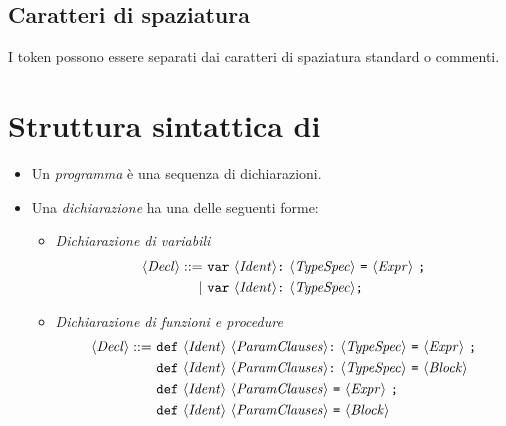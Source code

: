 \subsection*{Caratteri di spaziatura}
I token possono essere separati dai caratteri di spaziatura standard o commenti.

\section{Struttura sintattica di \SBF}
\begin{itemize}
\item Un \emph{programma} è una sequenza di dichiarazioni.

\item Una \emph{dichiarazione} ha una delle seguenti forme:
\begin{itemize}
	\item \emph{Dichiarazione di variabili}
	\begin{align*}
	\token{Decl} ::=\ &\texttt{var}\ \token{Ident} \texttt{:}\ \token{TypeSpec}\ \texttt{=}\ \token{Expr}\ \texttt{;}\\
	|\ &\texttt{var}\ \token{Ident} \texttt{:}\ \token{TypeSpec} \texttt{;}
	\end{align*}
	
	\item \emph{Dichiarazione di funzioni e procedure}
	\begin{align*}
	\token{Decl} ::=\ & \texttt{def}\ \token{Ident}\ \token{ParamClauses} \texttt{:}\ \token{TypeSpec}\ \texttt{=}\ \token{Expr}\ \texttt{;}\\
	& \texttt{def}\ \token{Ident}\ \token{ParamClauses} \texttt{:}\ \token{TypeSpec}\ \texttt{=}\ \token{Block}\\
	& \texttt{def}\ \token{Ident}\ \token{ParamClauses}\ \texttt{=}\ \token{Expr}\ \texttt{;}\\
	& \texttt{def}\ \token{Ident}\ \token{ParamClauses}\ \texttt{=}\ \token{Block}
	\end{align*}
	

\end{itemize}
\end{itemize}
